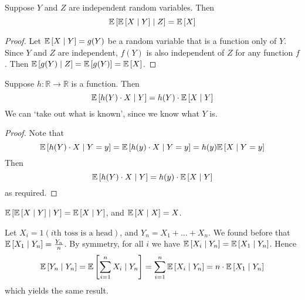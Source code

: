 \begin{proposition}
	Suppose \(Y\) and \(Z\) are independent random variables.
	Then
	\[
		\mathbb{E}\left[{\mathbb{E}\left[{X \mid Y}\right] \mid Z}\right] = \mathbb{E}\left[{X}\right]
	\]
\end{proposition}
\begin{proof}
	Let \(\mathbb{E}\left[{X \mid Y}\right] = g(Y)\) be a random variable that is a function only of \(Y\).
	Since \(Y\) and \(Z\) are independent, \(f(Y)\) is also independent of \(Z\) for any function \(f\).
	Then \(\mathbb{E}\left[{g(Y) \mid Z}\right] = \mathbb{E}\left[{g(Y)}\right] = \mathbb{E}\left[{X}\right]\).
\end{proof}
\begin{proposition}
	Suppose \(h \colon \mathbb R \to \mathbb R\) is a function.
	Then
	\[
		\mathbb{E}\left[{h(Y) \cdot X \mid Y}\right] = h(Y) \cdot \mathbb{E}\left[{X \mid Y}\right]
	\]
	We can `take out what is known', since we know what \(Y\) is.
\end{proposition}
\begin{proof}
	Note that
	\[
		\mathbb{E}\left[{h(Y) \cdot X \mid Y = y}\right] = \mathbb{E}\left[{h(y) \cdot X \mid Y = y}\right] = h(y) \mathbb{E}\left[{X \mid Y = y}\right]
	\]
	Then
	\[
		\mathbb{E}\left[{h(Y) \cdot X \mid Y}\right] = h(y) \cdot \mathbb{E}\left[{X \mid Y}\right]
	\]
	as required.
\end{proof}
\begin{corollary}
	\(\mathbb{E}\left[{\mathbb{E}\left[{X \mid Y}\right] \mid Y}\right] = \mathbb{E}\left[{X \mid Y}\right]\), and \(\mathbb{E}\left[{X \mid X}\right] = X\).
\end{corollary}
Let \(X_i = 1(i\text{th toss is a head})\), and \(Y_n = X_1 + \dots + X_n\).
We found before that \(\mathbb{E}\left[{X_1 \mid Y_n}\right] = \frac{Y_n}{n}\).
By symmetry, for all \(i\) we have \(\mathbb{E}\left[{X_i \mid Y_n}\right] = \mathbb{E}\left[{X_1 \mid Y_n}\right]\).
Hence
\[
	\mathbb{E}\left[{Y_n \mid Y_n}\right] = \mathbb{E}\left[{\sum_{i=1}^n X_i \mid Y_n}\right] = \sum_{i=1}^n \mathbb{E}\left[{X_i \mid Y_n}\right] = n \cdot \mathbb{E}\left[{X_1 \mid Y_n}\right]
\]
which yields the same result.
